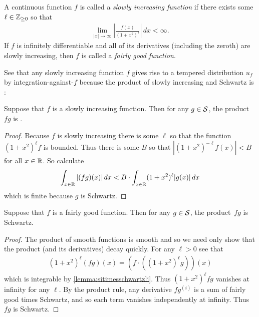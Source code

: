   \begin{defn}
    A continuous function $f$ is called a \emph{slowly increasing function} if there exists some $\ell\in\Z_{\ge0}$ so that
    \begin{align*}
      \lim_{|x|\rightarrow\infty} \left| \frac{f(x)}{(1+x^2)^{\ell}} \right| \,dx < \infty \text{.}
    \end{align*}
    If $f$ is infinitely differentiable and all of its derivatives (including the zeroth) are slowly increasing, then $f$ is called a \emph{fairly good function}.
  \end{defn}
  See that any slowly increasing function $f$ gives rise to a tempered distribution $u_f$ by integration-against-$f$ because the product of slowly increasing and Schwartz is \li:
  \begin{lemma}
    \label{lemma:sitimesschwartzli}
    Suppose that $f$ is a slowly increasing function.
    Then for any $g\in\S$, the product $fg$ is \li.
  \end{lemma}
  \begin{proof}
    Because $f$ is slowly increasing there is some $\ell$ so that the function $(1+x^2)^\ell f$ is bounded.
    Thus there is some $B$ so that $|(1+x^2)^{-\ell} f(x)|<B$ for all $x\in\R$.
    So calculate
    \begin{align*}
      \int_{x\in\R} |(fg)(x)|\,dx
      < B\cdot \int_{x\in\R} (1+x^2)^\ell |g(x)|\,dx
    \end{align*}
    which is finite because $g$ is Schwartz.
  \end{proof}
  \begin{lemma}
    Suppose that $f$ is a fairly good function.
    Then for any $g\in\S$, the product~$fg$ is Schwartz.
  \end{lemma}
  \begin{proof}
    The product of smooth functions is smooth and so we need only show that the product (and its derivatives) decay quickly.
    For any $\ell>0$ see that 
    \begin{align*}
      (1+x^2)^\ell (fg)(x) = \left(f\cdot((1+x^2)^\ell g)\right)(x)
    \end{align*}
    which is integrable by \cref{lemma:sitimesschwartzli}.
    Thus $(1+x^2)^\ell fg$ vanishes at infinity for any $\ell$.
    By the product rule, any derivative $fg^{(i)}$ is a sum of fairly good times Schwartz, and so each term vanishes independently at infinity.
    Thus $fg$ is Schwartz.
  \end{proof}

